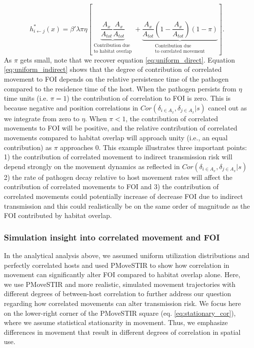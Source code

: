 \documentclass[letterpaper]{article}
\begin{document}
\begin{equation}
    h^*_{i \leftarrow j}(x) = \beta' \lambda \pi \eta \left[ \underbrace{\frac{A_x}{A_{tot}}\frac{A_x}{A_{tot}}}_{\substack{\text{Contribution due} \\ \text{to habitat overlap}}} + \underbrace{\frac{A_x}{A_{tot}}(1 - \frac{A_x}{A_{tot}}) (1 - \pi)}_{\substack{\text{Contribution due} \\ \text{to correlated movement}}} \right].
    \label{eq:uniform_indirect}
\end{equation}
As $\pi$ gets small, note that we recover equation \ref{eq:uniform_direct}.  Equation \ref{eq:uniform_indirect} shows that the degree of contribution of correlated movement to FOI depends on the relative persistence time of the pathogen compared to the residence time of the host.  When the pathogen persists from $\eta$ time units (i.e. $\pi = 1$) the contribution of correlation to FOI is zero.  This is because negative and position correlations in $Cor(\delta_{i \in A_x}, \delta_{j \in A_x} | s)$ cancel out as we integrate from zero to $\eta$.  When $\pi < 1$, the contribution of correlated movements to FOI will be positive, and the relative contribution of correlated movements compared to habitat overlap will approach unity (i.e., an equal contribution) as $\pi$ approaches 0. This example illustrates three important points: 1) the contribution of correlated movement to indirect transmission risk will depend strongly on the movement dynamics as reflected in $Cor(\delta_{i \in A_x}, \delta_{j \in A_x} | s)$ 2) the rate of pathogen decay relative to host movement rates will affect the contribution of correlated movements to FOI and 3) the contribution of correlated movements could potentially increase of decrease FOI due to indirect transmission and this could realistically be on the same order of magnitude as the FOI contributed by habitat overlap.  

\subsubsection*{Simulation insight into correlated movement and FOI}

In the analytical analysis above, we assumed uniform utilization distributions and perfectly correlated hosts and used PMoveSTIR to show how correlation in movement can significantly alter FOI compared to habitat overlap alone. Here, we use PMoveSTIR and more realistic, simulated movement trajectories with different degrees of between-host correlation to further address our question regarding how correlated movements can alter transmission risk. We focus here on the lower-right corner of the PMoveSTIR square (eq. \ref{eq:stationary_cor}), where we assume statistical stationarity in movement. Thus, we emphasize differences in movement that result in different degrees of correlation in spatial use. 
\end{document}
